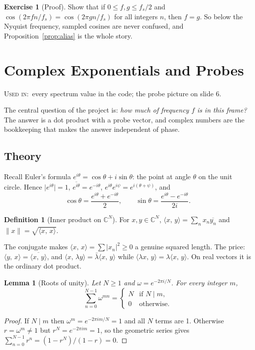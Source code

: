 \documentclass[11pt]{article}
\newtheorem{lemma}[theorem]{Lemma}
\theoremstyle{definition}
\newtheorem{definition}[theorem]{Definition}
\newtheorem{innerexercise}{Exercise}[section]
\newenvironment{exercise}[1][]{\begin{innerexercise}[#1]}{\end{innerexercise}}
\newcommand{\C}{\mathbb{C}}
\newcommand{\ip}[2]{\langle #1,\, #2\rangle}
\newcommand{\norm}[1]{\lVert #1\rVert}
\newcommand{\abs}[1]{\lvert #1\rvert}
\newcommand{\usedin}[1]{\par\noindent\colorbox{black!8}{\parbox{\dimexpr\linewidth-2\fboxsep\relax}{\small\textsc{Used in:}~#1}}\par\medskip}
\begin{document}
\begin{exercise}[Proof]\label{ex:nyqinj}
Show that if $0\le f,g\le f_s/2$ and $\cos(2\pi fn/f_s)=\cos(2\pi gn/f_s)$ for all
integers $n$, then $f=g$. So below the Nyquist frequency, sampled cosines are never
confused, and Proposition~\ref{prop:alias} is the whole story.
\end{exercise}

\section{Complex Exponentials and Probes}\label{sec:complex}
\usedin{every spectrum value in the code; the probe picture on slide 6.}

The central question of the project is: \emph{how much of frequency $f$ is in this
frame?} The answer is a dot product with a probe vector, and complex numbers are the
bookkeeping that makes the answer independent of phase.

\subsection{Theory}

Recall Euler's formula $e^{i\theta}=\cos\theta+i\sin\theta$: the point at angle
$\theta$ on the unit circle. Hence $\abs{e^{i\theta}}=1$,
$\overline{e^{i\theta}}=e^{-i\theta}$, $e^{i\theta}e^{i\psi}=e^{i(\theta+\psi)}$, and
\[
\cos\theta=\frac{e^{i\theta}+e^{-i\theta}}{2},\qquad
\sin\theta=\frac{e^{i\theta}-e^{-i\theta}}{2i}.
\]

\begin{definition}[Inner product on $\C^N$]
For $x,y\in\C^N$, $\ip{x}{y}=\sum_{n}x_n\overline{y_n}$ and $\norm{x}=\sqrt{\ip xx}$.
\end{definition}

The conjugate makes $\ip xx=\sum\abs{x_n}^2\ge0$ a genuine squared length. The price:
$\ip yx=\overline{\ip xy}$, and $\ip{x}{\lambda y}=\bar\lambda\ip xy$ while
$\ip{\lambda x}{y}=\lambda\ip xy$. On real vectors it is the ordinary dot product.

\begin{lemma}[Roots of unity]\label{lem:roots}
Let $N\ge1$ and $\omega=e^{-2\pi i/N}$. For every integer $m$,
\[
\sum_{n=0}^{N-1}\omega^{mn}=\begin{cases}N&\text{if }N\mid m,\\0&\text{otherwise.}\end{cases}
\]
\end{lemma}
\begin{proof}
If $N\mid m$ then $\omega^m=e^{-2\pi i m/N}=1$ and all $N$ terms are 1. Otherwise
$r=\omega^m\ne1$ but $r^N=e^{-2\pi i m}=1$, so the geometric series gives
$\sum_{n=0}^{N-1}r^n=(1-r^N)/(1-r)=0$.
\end{proof}
\end{document}
